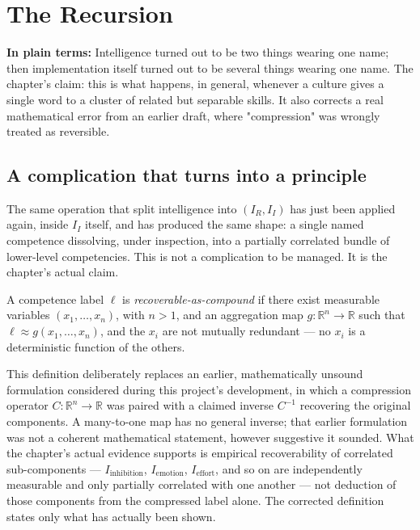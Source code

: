 \chapter{The Recursion}
\label{ch:recursion}

\begin{plainlanguage}
\textbf{In plain terms:} Intelligence turned out to be two things wearing one name; then implementation itself turned out to be several things wearing one name. The chapter's claim: this is what happens, in general, whenever a culture gives a single word to a cluster of related but separable skills. It also corrects a real mathematical error from an earlier draft, where "compression" was wrongly treated as reversible.
\end{plainlanguage}

\section{A complication that turns into a principle}

The same operation that split intelligence into $(I_R, I_I)$ has just been applied again, inside $I_I$ itself, and has produced the same shape: a single named competence dissolving, under inspection, into a partially correlated bundle of lower-level competencies. This is not a complication to be managed. It is the chapter's actual claim.

\begin{definition}
A competence label $\ell$ is \emph{recoverable-as-compound} if there exist measurable variables $(x_1, \ldots, x_n)$, with $n > 1$, and an aggregation map $g : \mathbb{R}^n \to \mathbb{R}$ such that $\ell \approx g(x_1, \ldots, x_n)$, and the $x_i$ are not mutually redundant --- no $x_i$ is a deterministic function of the others.
\end{definition}

This definition deliberately replaces an earlier, mathematically unsound formulation considered during this project's development, in which a compression operator $C : \mathbb{R}^n \to \mathbb{R}$ was paired with a claimed inverse $C^{-1}$ recovering the original components. A many-to-one map has no general inverse; that earlier formulation was not a coherent mathematical statement, however suggestive it sounded. What the chapter's actual evidence supports is empirical recoverability of correlated sub-components --- $I_{\text{inhibition}}$, $I_{\text{emotion}}$, $I_{\text{effort}}$, and so on are independently measurable and only partially correlated with one another --- not deduction of those components from the compressed label alone. The corrected definition states only what has actually been shown.

